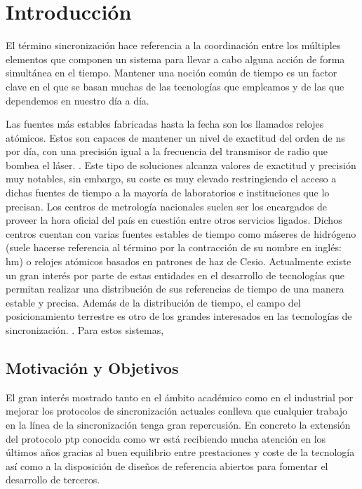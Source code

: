 \chapter{Introducción}

El término sincronización hace referencia a la coordinación entre los múltiples 
elementos que componen un sistema para llevar a cabo alguna acción de forma 
simultánea en el tiempo. Mantener una noción común de tiempo es un factor clave 
en el que se basan muchas de las tecnologías que empleamos y de las que 
dependemos en nuestro día a día.

 Las 
fuentes más estables fabricadas hasta la fecha son los llamados relojes
atómicos. 
 Estos son capaces de mantener un nivel de exactitud del 
orden de \gls{ns} por día, con una precisión igual a la frecuencia del
transmisor de radio que bombea el láser.  . Este tipo de 
soluciones alcanza valores de exactitud y precisión muy notables, sin embargo, 
su coste es muy elevado restringiendo el acceso a dichas fuentes de tiempo a la 
mayoría de laboratorios e instituciones que lo precisan. Los centros de 
metrología nacionales suelen ser los encargados de proveer la hora oficial del 
país en cuestión entre otros servicios ligados. Dichos centros cuentan con 
varias fuentes estables de tiempo como máseres de hidrógeno (suele
hacerse referencia al término por la contracción de su nombre en inglés: 
\acrshort{hm}) o relojes atómicos basados en patrones de haz de Cesio. 
Actualmente existe un gran interés por parte de estas entidades en el 
desarrollo de tecnologías que permitan realizar una distribución de sus 
referencias de tiempo de una manera estable y precisa.
Además de la distribución de tiempo, el campo del posicionamiento terrestre es 
otro de los grandes interesados en las tecnologías de sincronización. 
. Para estos sistemas, 

\section{Motivación y Objetivos}

El gran interés mostrado tanto en el ámbito académico como en el industrial por 
mejorar los protocolos de sincronización actuales conlleva que cualquier 
trabajo en la línea de la sincronización tenga gran repercusión. En concreto la 
extensión del protocolo \gls{ptp} conocida como \gls{wr} está recibiendo mucha 
atención en los últimos años gracias al buen equilibrio entre prestaciones y 
coste de la tecnología así como a la disposición de diseños de referencia 
abiertos para fomentar el desarrollo de terceros.


